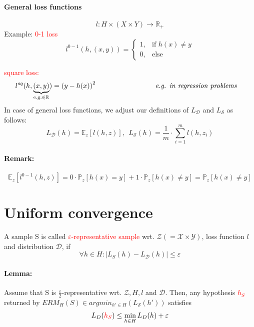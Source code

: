 \documentclass[10pt,a4paper]{article}
\theoremstyle{definition}
\theoremstyle{plain}
\begin{document}
\paragraph{General loss functions}
	$$ l: H \times (X \times Y) \rightarrow \mathbb{R}_+ $$
Example: \textcolor{red}{0-1 loss}\\
$$ l^{0-1}\left( h, \left(x,y\right) \right) = \begin{cases}
	1, &  \text{if } h(x) \neq y  \\
	0, &  \text{else} 
\end{cases}$$

\textcolor{red}{square loss:}
\begin{align*}
l^{sq}(h, \underbrace{\left(x,y\right)}_{\text{e.g.} \in \mathbb{R}}) =  \left(y-h(x)\right)^2 & \hspace{3cm} \text{\textit{e.g. in regression problems}}
\end{align*}
In case of general loss functions, we adjust our definitions of $L_\mathcal{D}$ and $L_\mathcal{S}$ as follows:
$$ 
L_\mathcal{D}(h) =  \mathbb{E}_z[l(h, z)], \ \  L_\mathcal{S}(h) = \frac{1}{m} \cdot \sum_{i = 1}^{m} l(h, z_i)
$$

\paragraph{Remark:}
$$
\mathbb{E}_z\left[l^{0-1}(h,z)\right] = 0 \cdot \mathbb{P}_z[h(x) = y] + 1 \cdot \mathbb{P}_z[h(x) \neq y] = \mathbb{P}_z[h(x) \neq y]
$$

\section*{Uniform convergence}
\begin{boxeddef}
	A sample S is called \textcolor{red}{$\varepsilon$-representative sample} wrt. $\mathcal{Z} (= \mathcal{X}\times\mathcal{Y})$, loss function $l$ and distribution $\mathcal{D}$, if
	$$
	\forall h \in H: \left|L_S(h) - L_\mathcal{D}(h)\right| \leq \varepsilon
	$$
\end{boxeddef}
\paragraph{Lemma:} Assume that S is $\frac{\varepsilon}{2}$-representative wrt. $\mathcal{Z}, H, l$ and $\mathcal{D}$. Then, any hypothesis \textcolor{red}{$h_S$} returned by $ERM_H(S) \in argmin_{h' \in H}(L_\mathcal{S}(h'))$ satisfies
$$
	L_D(\text{\textcolor{red}{$h_S$}}) \leq \min_{h \in H} L_D(h) + \varepsilon
$$
\end{document}
